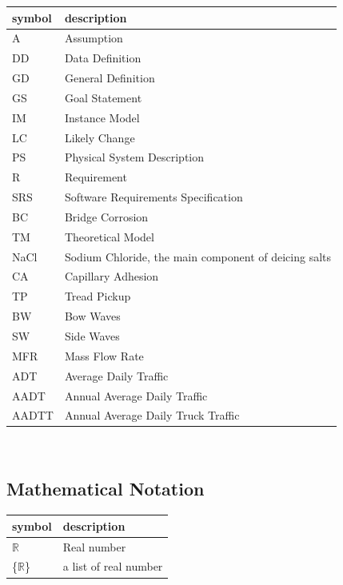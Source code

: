 \documentclass[12pt]{article}
\begin{document}
\renewcommand{\arraystretch}{1.2}
\begin{tabular}{l l} 
  \toprule		
  \textbf{symbol} & \textbf{description}\\
  \midrule 
  A & Assumption\\
  DD & Data Definition\\
  GD & General Definition\\
  GS & Goal Statement\\
  IM & Instance Model\\
  LC & Likely Change\\
  PS & Physical System Description\\
  R & Requirement\\
  SRS & Software Requirements Specification\\
  BC & Bridge Corrosion\\
  TM & Theoretical Model\\
  NaCl & Sodium Chloride, the main component of deicing salts \\
  CA & Capillary Adhesion \\
  TP & Tread Pickup\\
  BW & Bow Waves\\
  SW & Side Waves\\
  MFR & Mass Flow Rate\\
  ADT & Average Daily Traffic\\
  AADT & Annual Average Daily Traffic\\
  AADTT & Annual Average Daily Truck Traffic \\
  \bottomrule
\end{tabular}\\

\subsection{Mathematical Notation}
\renewcommand{\arraystretch}{1.2}
\begin{tabular}{l l} 
  \toprule		
  \textbf{symbol} & \textbf{description}\\
  \midrule 
  $\mathbb{R}$ & Real number \\
  \{$\mathbb{R}$\} & a list of real number\\
  \bottomrule
\end{tabular}\\

\newpage

\end{document}
